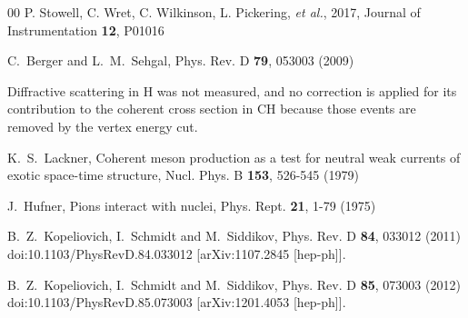 \documentclass[aps,prl,twocolumn,superscriptaddress,nofootinbib]{revtex4-1}
\begin{document}
\begin{thebibliography}{00}
P. Stowell, C. Wret, C. Wilkinson, L. Pickering, \textit{et al.}, 2017,
Journal of Instrumentation \textbf{12}, P01016


C.~Berger and L.~M.~Sehgal,
Phys. Rev. D \textbf{79}, 053003 (2009)

Diffractive scattering in H was not measured, and no correction
is applied for its contribution to the coherent cross section in 
CH because those events are removed by the vertex energy cut.

K.~S.~Lackner,
Coherent meson production as a test for neutral weak currents of exotic space-time structure,
Nucl. Phys. B \textbf{153}, 526-545 (1979)

J.~Hufner,
Pions interact with nuclei,
Phys. Rept. \textbf{21}, 1-79 (1975)

B.~Z.~Kopeliovich, I.~Schmidt and M.~Siddikov,
Phys. Rev. D \textbf{84}, 033012 (2011)
doi:10.1103/PhysRevD.84.033012
[arXiv:1107.2845 [hep-ph]].

B.~Z.~Kopeliovich, I.~Schmidt and M.~Siddikov,
Phys. Rev. D \textbf{85}, 073003 (2012)
doi:10.1103/PhysRevD.85.073003
[arXiv:1201.4053 [hep-ph]].


\end{thebibliography}
\end{document}
